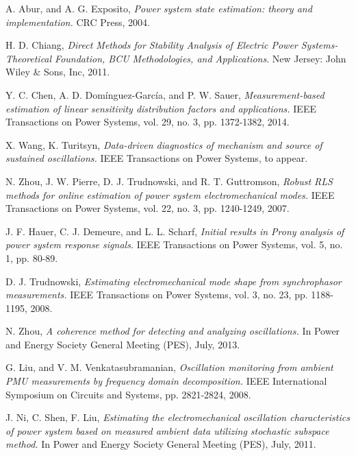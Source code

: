\documentclass[journal]{IEEEtran}
\begin{document}
\begin{thebibliography}{1}
A. Abur, and A. G. Exposito, {\em Power system state estimation: theory and implementation.}
\newblock CRC Press, 2004.

H. D. Chiang, {\em Direct Methods for Stability Analysis of Electric Power Systems-Theoretical Foundation, BCU Methodologies, and Applications}.
\newblock New Jersey: John Wiley \& Sons, Inc, 2011.

Y. C. Chen, A. D. Dom\'{i}nguez-Garc\'{i}a, and P. W. Sauer, {\em Measurement-based estimation of linear sensitivity distribution factors and applications.}
\newblock IEEE Transactions on Power Systems, vol. 29, no. 3, pp. 1372-1382, 2014.

X. Wang, K. Turitsyn, {\em Data-driven diagnostics of mechanism and source of sustained oscillations.}
\newblock IEEE Transactions on Power Systems, to appear.


N. Zhou, J. W. Pierre, D. J. Trudnowski, and R. T. Guttromson, {\em Robust RLS methods for online estimation of power system electromechanical modes.}
\newblock IEEE Transactions on Power Systems, vol. 22, no. 3, pp. 1240-1249, 2007.



J. F. Hauer, C. J. Demeure, and L. L. Scharf, {\em Initial results in Prony analysis of power system response signals.}
\newblock IEEE Transactions on Power Systems, vol. 5, no. 1, pp. 80-89.

D. J. Trudnowski, {\em Estimating electromechanical mode shape from synchrophasor measurements.}
\newblock IEEE Transactions on Power Systems, vol. 3, no. 23, pp. 1188-1195, 2008.

N. Zhou, {\em A coherence method for detecting and analyzing oscillations.}
\newblock In Power and Energy Society General Meeting (PES), July, 2013.

G. Liu, and V. M. Venkatasubramanian, {\em Oscillation monitoring from ambient PMU measurements by frequency domain decomposition.}
\newblock IEEE International Symposium on Circuits and Systems, pp. 2821-2824, 2008.

J. Ni, C. Shen, F. Liu, {\em Estimating the electromechanical oscillation characteristics of power system based on measured ambient data utilizing stochastic subspace method.}
\newblock In Power and Energy Society General Meeting (PES), July, 2011.


\end{thebibliography}
\end{document}
